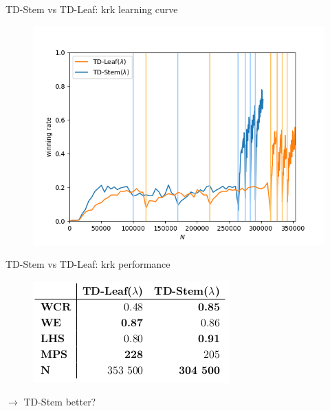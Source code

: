 \documentclass{beamer}
\begin{document}
\begin{frame}{TD-Stem vs TD-Leaf: krk learning curve}
\begin{figure}
\centering
\includegraphics[scale=0.6]{fig/plots/krk_lc}
\end{figure}
\end{frame}

\begin{frame}{TD-Stem vs TD-Leaf: krk performance}
\begin{figure}
\centering
\includegraphics[scale=0.6]{tab1}
\end{figure}
\begin{center}
$\rightarrow$ TD-Stem better?
\end{center}
\end{frame}
\end{document}
